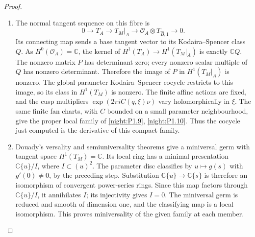\documentclass[11pt,a4paper]{article}
\numberwithin{equation}{section}
\theoremstyle{definition}
\begin{document}
\begin{proof}
\begin{enumerate}[label=\arabic*.]
\item The normal tangent sequence on this fibre is
\[
0\longrightarrow T_A\longrightarrow T_M|_A
\longrightarrow\mathcal O_A\otimes T_{\widehat B,1}
\longrightarrow0.
\]
Its connecting map sends a base tangent vector to its
Kodaira--Spencer class $Q$.  As $H^0(\mathcal O_A)=\mathbb C$,
the kernel of $H^1(T_A)\to H^1(T_M|_A)$ is exactly
$\mathbb C Q$.  The nonzero matrix $P$ has determinant zero;
every nonzero scalar multiple of $Q$ has nonzero determinant.
Therefore the image of $P$ in $H^1(T_M|_A)$ is nonzero.
The global parameter Kodaira--Spencer cocycle restricts to this
image, so its class in $H^1(T_M)$ is nonzero.
The finite affine actions are fixed, and the cusp multipliers
$\exp(2\pi iC(q,\xi)\nu)$ vary holomorphically in $\xi$.
The same finite fan charts, with $C$ bounded on a small parameter
neighbourhood, give the proper local family of
\cref{night:P1.9}, \cref{night:P1.10}.  Thus the cocycle just computed is
the derivative of this compact family.

\item Douady's versality and semiuniversality theorems
\cite[\S VII.8, pp.~598--599; \S VIII.1, pp.~599--600]{Douady1974}
give a miniversal germ with tangent space $H^1(T_M)=\mathbb C$.
Its local ring has a minimal presentation $\mathbb C\{u\}/I$,
where $I\subset(u)^2$.  The parameter disc classifies by
$u\mapsto g(s)$ with $g'(0)\ne0$, by the preceding step.
Substitution $\mathbb C\{u\}\to\mathbb C\{s\}$ is therefore an
isomorphism of convergent power-series rings.  Since this map factors
through $\mathbb C\{u\}/I$, it annihilates $I$; its injectivity
gives $I=0$.  The miniversal germ is reduced and smooth of dimension
one, and the classifying map is a local isomorphism.  This proves
miniversality of the given family at each member.
\end{enumerate}
\end{proof}
\end{document}
